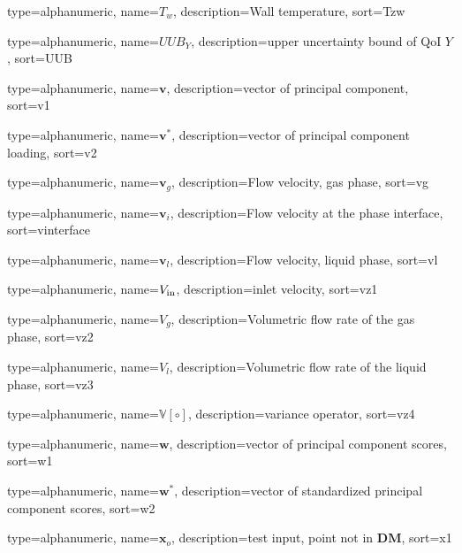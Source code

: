 {
  type=alphanumeric,
	name={\ensuremath{T_{w}}},
	description={Wall temperature},
	sort={Tzw}
}

{
  type=alphanumeric,
	name={\ensuremath{UUB_Y}},
	description={upper uncertainty bound of QoI $Y$},
	sort={UUB}
}

{
  type=alphanumeric,
	name={\ensuremath{\mathbf{v}}},
	description={vector of principal component},
	sort={v1}
}

{
  type=alphanumeric,
	name={\ensuremath{\mathbf{v}^*}},
	description={vector of principal component loading},
	sort={v2}
}

{
  type=alphanumeric,
	name={\ensuremath{\mathbf{v}_g}},
	description={Flow velocity, gas phase},
	sort={vg}
}	

{
  type=alphanumeric,
	name={\ensuremath{\mathbf{v}_i}},
	description={Flow velocity at the phase interface},
	sort={vinterface}
}	

{
  type=alphanumeric,
	name={\ensuremath{\mathbf{v}_l}},
	description={Flow velocity, liquid phase},
	sort={vl}
}

{
  type=alphanumeric,
	name={\ensuremath{V_\textnormal{in}}},
	description={inlet velocity},
	sort={vz1}
}

{
  type=alphanumeric,
	name={\ensuremath{V_{g}}},
	description={Volumetric flow rate of the gas phase},
	sort={vz2}
}

{
  type=alphanumeric,
	name={\ensuremath{V_{l}}},
	description={Volumetric flow rate of the liquid phase},
	sort={vz3}
}

{
  type=alphanumeric,
	name={\ensuremath{\mathbb{V[\circ]}}},
	description={variance operator},
	sort={vz4}
}

{
  type=alphanumeric,
	name={\ensuremath{\bm{w}}},
	description={vector of principal component scores},
	sort={w1}
}

{
  type=alphanumeric,
	name={\ensuremath{\bm{w}^*}},
	description={vector of standardized principal component scores},
	sort={w2}
}

{
  type=alphanumeric,
	name={\ensuremath{\bm{x}_o}},
	description={test input, point not in $\mathbf{DM}$},
	sort={x1}
}


